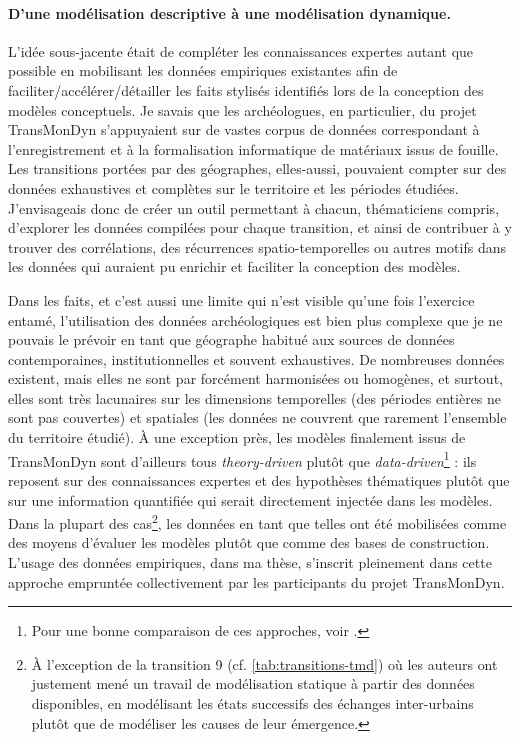 \paragraph{D'une modélisation descriptive à une modélisation dynamique.}

L'idée sous-jacente était de compléter les connaissances expertes autant que possible en mobilisant les données empiriques existantes afin de faciliter/accélérer/détailler les faits stylisés identifiés lors de la conception des modèles conceptuels.
Je savais que les archéologues, en particulier, du projet TransMonDyn s'appuyaient sur de vastes corpus de données correspondant à l'enregistrement et à la formalisation informatique de matériaux issus de fouille.
Les transitions portées par des géographes, elles-aussi, pouvaient compter sur des données exhaustives et complètes sur le territoire et les périodes étudiées.
J'envisageais donc de créer un outil permettant à chacun, thématiciens compris, d'explorer les données compilées pour chaque transition, et ainsi de contribuer à y trouver des corrélations, des récurrences spatio-temporelles ou autres motifs dans les données qui auraient pu enrichir et faciliter la conception des modèles.

Dans les faits, et c'est aussi une limite qui n'est visible qu'une fois l'exercice entamé, l'utilisation des données archéologiques est bien plus complexe que je ne pouvais le prévoir en tant que géographe habitué aux sources de données contemporaines, institutionnelles et souvent exhaustives.
De nombreuses \og données\fg{} existent, mais elles ne sont par forcément harmonisées ou homogènes, et surtout, elles sont très lacunaires sur les dimensions temporelles (des périodes entières ne sont pas couvertes) et spatiales (les données ne couvrent que rarement l'ensemble du territoire étudié).
À une exception près, les modèles finalement issus de TransMonDyn sont d'ailleurs tous \og \textit{theory-driven}\fg{} plutôt que \og \textit{data-driven}\fg{}\footnote{
	Pour une bonne comparaison de ces approches, voir \textcite[120--122]{mathian_objets_2014}.
} :
	ils reposent sur des connaissances expertes et des hypothèses thématiques plutôt que sur une information quantifiée qui serait directement injectée dans les modèles.
Dans la plupart des cas\footnote{
	À l'exception de la transition 9 (cf. \cref{tab:transitions-tmd}) où les auteurs \autocite{bretagnolle_transition_2018} ont justement mené un travail de modélisation \og statique\fg{} à partir des données disponibles, en modélisant les états successifs des échanges inter-urbains plutôt que de modéliser les causes de leur émergence. 
}, les données en tant que telles ont été mobilisées comme des moyens d'évaluer les modèles plutôt que comme des bases de construction.
L'usage des données empiriques, dans ma thèse, s'inscrit pleinement dans cette approche empruntée collectivement par les participants du projet TransMonDyn.

